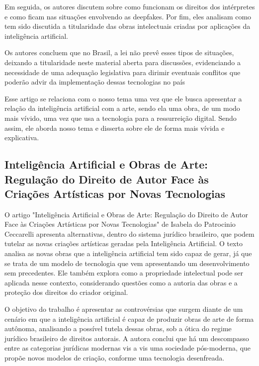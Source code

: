 \documentclass[12pt]{article}
\begin{document}
    Em  seguida,  os autores discutem sobre como  funcionam  os  direitos  dos  intérpretes e como ficam nas situações envolvendo as deepfakes.  Por  fim,  eles analisam como tem sido discutida a titularidade das obras intelectuais criadas por aplicações da inteligência artificial. 
    
    Os autores concluem que no Brasil, a lei não prevê esses tipos de situações, deixando a  titularidade  neste  material  aberta  para  discussões, evidenciando a necessidade de uma adequação  legislativa  para  dirimir  eventuais  conflitos que poderão advir da implementação dessas tecnologias no país
    
    Esse artigo se relaciona com o nosso tema uma vez que ele busca apresentar a relação da inteligência artificial com a arte, sendo ela uma obra, de um modo mais vívido, uma vez que usa a tecnologia para a ressurreição digital. Sendo assim, ele aborda nosso tema e disserta sobre ele de forma mais vívida e explicativa.


    \subsection{Inteligência Artificial e Obras de Arte: Regulação do Direito de Autor Face às Criações Artísticas por Novas Tecnologias}
	\label{sec:trab_relacionados}

    O artigo "Inteligência Artificial e Obras de Arte: Regulação do Direito de Autor Face às Criações Artísticas por Novas Tecnologias" de Isabela do Patrocinio Ceccarelli apresenta alternativas, dentro do sistema jurídico brasileiro, que podem tutelar as novas criações artísticas geradas pela Inteligência Artificial. O texto analisa as novas obras que a inteligência artificial tem sido capaz de gerar, já que se trata de um modelo de tecnologia que vem apresentando um desenvolvimento sem precedentes. Ele também explora como a propriedade intelectual pode ser aplicada nesse contexto, considerando questões como a autoria das obras e a proteção dos direitos do criador original.
    
    O objetivo do trabalho é apresentar as controvérsias que surgem diante de um cenário em que a inteligência artificial é capaz de produzir obras de arte de forma autônoma, analisando a possível tutela dessas obras, sob a ótica do regime jurídico brasileiro de direitos autorais. A autora conclui que há um descompasso entre as categorias jurídicas modernas vis a vis uma sociedade pós-moderna, que propõe novos modelos de criação, conforme uma tecnologia desenfreada.
    
\end{document}

